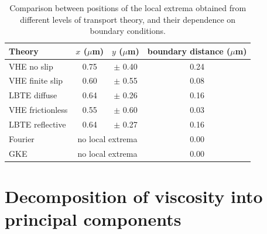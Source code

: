 \documentclass[
prb,
twocolumn,
superscriptaddress,
 amsmath,amssymb,
 aps,
longbibliography,
]{revtex4-2}
\begin{document}
\begin{table}[t]
\label{tab:loc_maxmin}
\caption{Comparison between positions of the local extrema obtained from different levels of transport theory, and their dependence on boundary conditions. }
\begin{tabular}{l|c|c|c}
  \hline
  \hline
Theory & $x$ ($\mu$m) & $y$ ($\mu$m) & boundary distance ($\mu$m) \\
\hline
VHE no slip            & 0.75 & $\pm$ 0.40  & 0.24 \\
\hline
VHE finite slip        & 0.60 & $\pm$ 0.55  & 0.08 \\
LBTE diffuse    & 0.64 & $\pm$ 0.26  & 0.16 \\
\hline
VHE frictionless               & 0.55 & $\pm$ 0.60  & 0.03 \\
LBTE reflective  & 0.64 & $\pm$ 0.27  & 0.16 \\
\hline
Fourier            & \multicolumn{2}{c|}{no local extrema}    & 0.00 \\
GKE                & \multicolumn{2}{c|}{no local extrema}      & 0.00 \\
  \hline
  \hline
\end{tabular}

\end{table}


\section{Decomposition of viscosity into principal components}
\label{sec:viscosity_decomposition}
\end{document}
